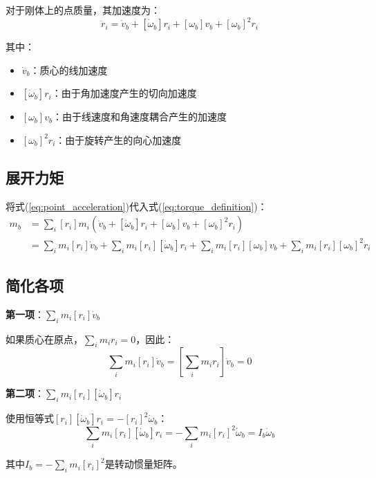 \documentclass[12pt,a4paper]{article}
\begin{document}
对于刚体上的点质量，其加速度为：
\begin{equation}
\ddot{r}_i = \dot{v}_b + [\dot{\omega}_b] r_i + [\omega_b] v_b + [\omega_b]^2 r_i
\label{eq:point_acceleration}
\end{equation}

其中：
\begin{itemize}
\item $\dot{v}_b$：质心的线加速度
\item $[\dot{\omega}_b] r_i$：由于角加速度产生的切向加速度
\item $[\omega_b] v_b$：由于线速度和角速度耦合产生的加速度
\item $[\omega_b]^2 r_i$：由于旋转产生的向心加速度
\end{itemize}

\subsection{展开力矩}

将式(\ref{eq:point_acceleration})代入式(\ref{eq:torque_definition})：
\begin{align}
m_b &= \sum_i [r_i] m_i (\dot{v}_b + [\dot{\omega}_b] r_i + [\omega_b] v_b + [\omega_b]^2 r_i) \\
&= \sum_i m_i [r_i] \dot{v}_b + \sum_i m_i [r_i][\dot{\omega}_b] r_i + \sum_i m_i [r_i][\omega_b] v_b + \sum_i m_i [r_i][\omega_b]^2 r_i
\end{align}

\subsection{简化各项}

\textbf{第一项}：$\sum_i m_i [r_i] \dot{v}_b$

如果质心在原点，$\sum_i m_i r_i = 0$，因此：
\begin{equation}
\sum_i m_i [r_i] \dot{v}_b = [\sum_i m_i r_i] \dot{v}_b = 0
\end{equation}

\textbf{第二项}：$\sum_i m_i [r_i][\dot{\omega}_b] r_i$

使用恒等式$[r_i][\dot{\omega}_b] r_i = -[r_i]^2 \dot{\omega}_b$：
\begin{equation}
\sum_i m_i [r_i][\dot{\omega}_b] r_i = -\sum_i m_i [r_i]^2 \dot{\omega}_b = I_b \dot{\omega}_b
\end{equation}

其中$I_b = -\sum_i m_i [r_i]^2$是转动惯量矩阵。
\end{document}
